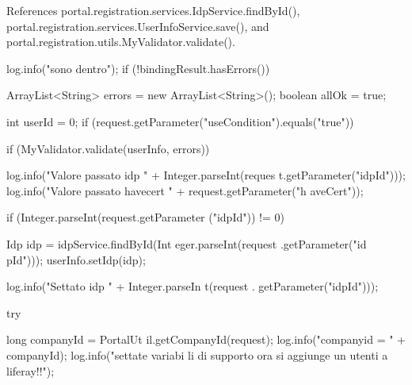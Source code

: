 References portal.registration.services.IdpService.findById(), portal.registration.services.UserInfoService.save(), and portal.registration.utils.MyValidator.validate().


\begin{DoxyCode}
                                                                {

                log.info("sono dentro");
                if (!bindingResult.hasErrors()) {

                        ArrayList<String> errors = new ArrayList<String>();
                        boolean allOk = true;

                        int userId = 0;
                        if (request.getParameter("useCondition").equals("true")) 
      {
                                if (MyValidator.validate(userInfo, errors)) {

                                        log.info("Valore passato idp "
                                                        + Integer.parseInt(reques
      t.getParameter("idpId")));
                                        log.info("Valore passato havecert "
                                                        + request.getParameter("h
      aveCert"));

                                        if (Integer.parseInt(request.getParameter
      ("idpId")) != 0) {
                                                Idp idp = idpService.findById(Int
      eger.parseInt(request
                                                                .getParameter("id
      pId")));
                                                userInfo.setIdp(idp);

                                                log.info("Settato idp "
                                                                + Integer.parseIn
      t(request
                                                                                .
      getParameter("idpId")));

                                                try {

                                                        long companyId = PortalUt
      il.getCompanyId(request);
                                                        log.info("companyid = " +
       companyId);
                                                        log.info("settate variabi
      li di supporto ora si aggiunge un utenti a liferay!!");

}}}}}}
\end{DoxyCode}
